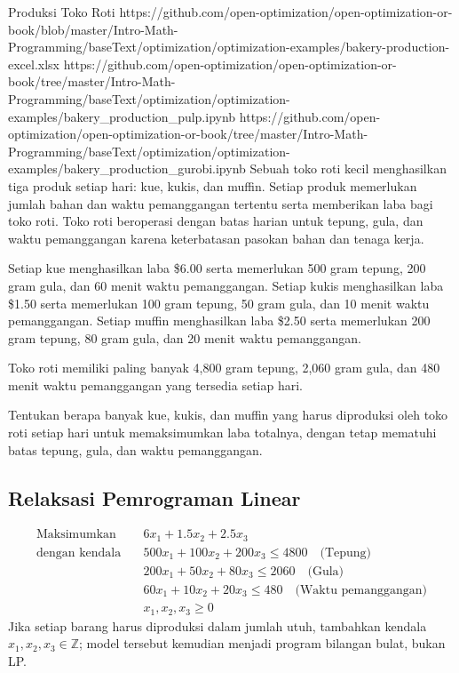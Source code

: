 \newpage
\begin{examplewithallcode}{Produksi Toko Roti}
{https://github.com/open-optimization/open-optimization-or-book/blob/master/Intro-Math-Programming/baseText/optimization/optimization-examples/bakery-production-excel.xlsx}
{https://github.com/open-optimization/open-optimization-or-book/tree/master/Intro-Math-Programming/baseText/optimization/optimization-examples/bakery_production_pulp.ipynb}
{https://github.com/open-optimization/open-optimization-or-book/tree/master/Intro-Math-Programming/baseText/optimization/optimization-examples/bakery_production_gurobi.ipynb}
\label{example:bakery-production}
Sebuah toko roti kecil menghasilkan tiga produk setiap hari: kue, kukis, dan muffin. Setiap produk memerlukan jumlah bahan dan waktu pemanggangan tertentu serta memberikan laba bagi toko roti. Toko roti beroperasi dengan batas harian untuk tepung, gula, dan waktu pemanggangan karena keterbatasan pasokan bahan dan tenaga kerja.

Setiap kue menghasilkan laba \$6.00 serta memerlukan 500 gram tepung, 200 gram gula, dan 60 menit waktu pemanggangan. Setiap kukis menghasilkan laba \$1.50 serta memerlukan 100 gram tepung, 50 gram gula, dan 10 menit waktu pemanggangan. Setiap muffin menghasilkan laba \$2.50 serta memerlukan 200 gram tepung, 80 gram gula, dan 20 menit waktu pemanggangan.

Toko roti memiliki paling banyak 4,800 gram tepung, 2,060 gram gula, dan 480 menit waktu pemanggangan yang tersedia setiap hari.

Tentukan berapa banyak kue, kukis, dan muffin yang harus diproduksi oleh toko roti setiap hari untuk memaksimumkan laba totalnya, dengan tetap mematuhi batas tepung, gula, dan waktu pemanggangan.

\subsection*{Relaksasi Pemrograman Linear}

\[
\begin{aligned}
\text{Maksimumkan} \quad & 6x_1 + 1.5x_2 + 2.5x_3 \\
\text{dengan kendala} \quad
& 500x_1 + 100x_2 + 200x_3 \leq 4800 \quad \text{(Tepung)} \\
& 200x_1 + 50x_2 + 80x_3 \leq 2060 \quad \text{(Gula)} \\
& 60x_1 + 10x_2 + 20x_3 \leq 480 \quad \text{(Waktu pemanggangan)} \\
& x_1, x_2, x_3 \geq 0
\end{aligned}
\]
Jika setiap barang harus diproduksi dalam jumlah utuh, tambahkan kendala $x_1,x_2,x_3\in\mathbb{Z}$; model tersebut kemudian menjadi program bilangan bulat, bukan LP.
\end{examplewithallcode}

